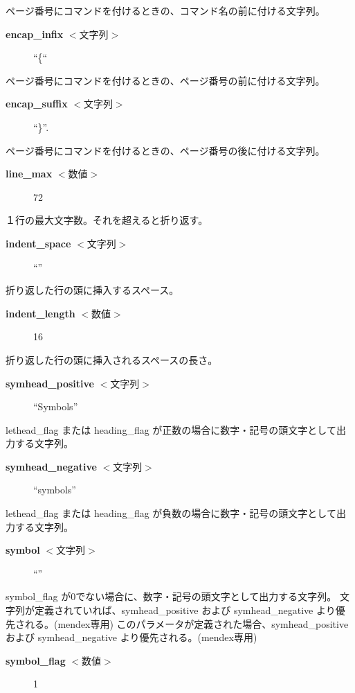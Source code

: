 \documentclass[10pt,dvipdfmx]{jsarticle}
\begin{document}
 ページ番号にコマンドを付けるときの、コマンド名の前に付ける文字列。\begin{description}
\item[\textbf{encap\_infix}
 $<$文字列$>$] ``\{``

\end{description}
 ページ番号にコマンドを付けるときの、ページ番号の前に付ける文字列。\begin{description}
\item[\textbf{encap\_suffix}
 $<$文字列$>$] ``\}''.

\end{description}
 ページ番号にコマンドを付けるときの、ページ番号の後に付ける文字列。\begin{description}
\item[\textbf{line\_max}
 $<$数値$>$] 72

\end{description}
 １行の最大文字数。それを超えると折り返す。\begin{description}
\item[\textbf{indent\_space}
 $<$文字列$>$] ``''

\end{description}
 折り返した行の頭に挿入するスペース。\begin{description}
\item[\textbf{indent\_length}
 $<$数値$>$] 16

\end{description}
 折り返した行の頭に挿入されるスペースの長さ。\begin{description}
\item[\textbf{symhead\_positive}
 $<$文字列$>$] ``Symbols''

\end{description}
 lethead\_flag または heading\_flag が正数の場合に数字・記号の頭文字として出力する文字列。\begin{description}
\item[\textbf{symhead\_negative}
 $<$文字列$>$] ``symbols''

\end{description}
 lethead\_flag または heading\_flag が負数の場合に数字・記号の頭文字として出力する文字列。\begin{description}
\item[\textbf{symbol}
 $<$文字列$>$] ``''

\end{description}
 symbol\_flag が0でない場合に、数字・記号の頭文字として出力する文字列。 文字列が定義されていれば、symhead\_positive および symhead\_negative より優先される。(mendex専用) このパラメータが定義された場合、symhead\_positive および symhead\_negative より優先される。(mendex専用)\begin{description}
\item[\textbf{symbol\_flag}
 $<$数値$>$] 1

\end{description}
\end{document}
